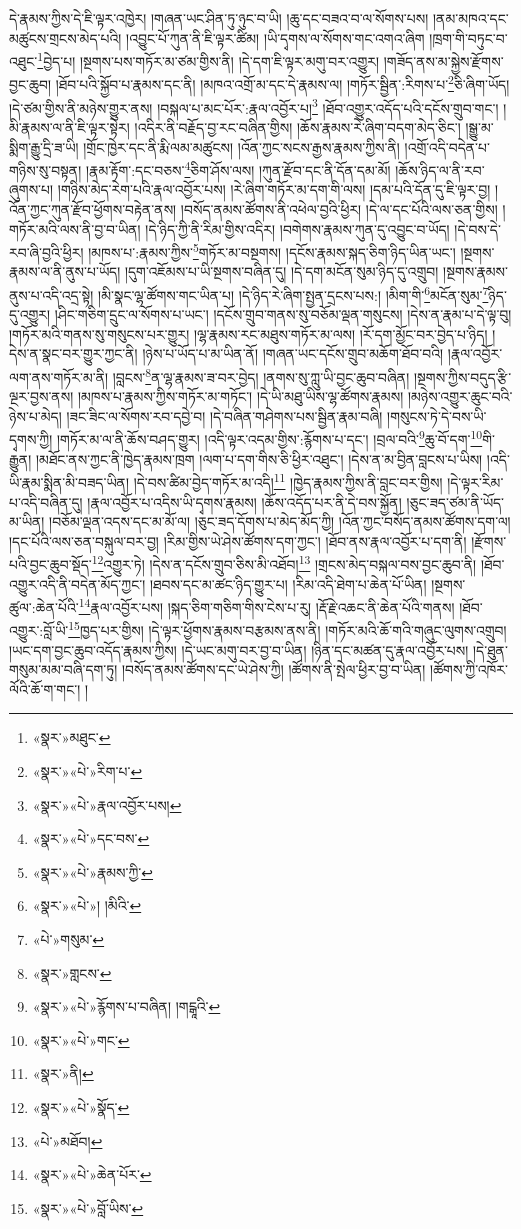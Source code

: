 དེ་རྣམས་ཀྱིས་དེ་ཇི་ལྟར་འཁྱེར། །གཞན་ཡང་ཤིན་ཏུ་ཉུང་བ་ཡི། །ཆུ་དང་བཟའ་བ་ལ་སོགས་པས། །ནམ་མཁའ་དང་མཚུངས་གྲངས་མེད་པའི། །འབྱུང་པོ་ཀུན་ནི་ཇི་ལྟར་ཚིམ། །ཡི་དྭགས་ལ་སོགས་གང་འགའ་ཞིག །ཁྲག་གི་བཏུང་བ་འཐུང་\footnote{«སྣར་»མཐུང་}བྱེད་པ། །སྔགས་པས་གཏོར་མ་ཙམ་གྱིས་ནི། །དེ་དག་ཇི་ལྟར་མགུ་བར་འགྱུར། །གཟོད་ནས་མ་སྐྱེས་རྫོགས་བྱང་ཆུབ། །ཐོབ་པའི་སྐྱོབ་པ་རྣམས་དང་ནི། །མཁའ་འགྲོ་མ་དང་དེ་རྣམས་ལ། །གཏོར་སྦྱིན་:རིགས་པ་\footnote{«སྣར་»«པེ་»རིག་པ་}ཅི་ཞིག་ཡོད། །དེ་ཙམ་གྱིས་ནི་མཉེས་གྱུར་ནས། །བསྐལ་པ་མང་པོར་:རྣལ་འབྱོར་པ།\footnote{«སྣར་»«པེ་»རྣལ་འབྱོར་པས།} །ཐོབ་འགྱུར་འདོད་པའི་དངོས་གྲུབ་གང་། །མི་རྣམས་ལ་ནི་ཇི་ལྟར་སྟེར། །འདིར་ནི་བརྗོད་བྱ་རང་བཞིན་གྱིས། །ཆོས་རྣམས་རེ་ཞིག་བདག་མེད་ཅིང་། །སྒྱུ་མ་སྨིག་རྒྱུ་དྲི་ཟ་ཡི། །གྲོང་ཁྱེར་དང་ནི་རྨི་ལམ་མཚུངས། །འོན་ཀྱང་སངས་རྒྱས་རྣམས་ཀྱིས་ནི། །འགྲོ་འདི་བདེན་པ་གཉིས་སུ་བསྟན། །རྣམ་རྟོག་:དང་བཅས་\footnote{«སྣར་»«པེ་»དང་བས་}ཅིག་ཤོས་ལས། །ཀུན་རྫོབ་དང་ནི་དོན་དམ་མོ། །ཆོས་ཉིད་ལ་ནི་རབ་ཞུགས་པ། །གཉིས་མེད་རེག་པའི་རྣལ་འབྱོར་པས། །རེ་ཞིག་གཏོར་མ་དག་གི་ལས། །དམ་པའི་དོན་དུ་ཇི་ལྟར་བྱ། །འོན་ཀྱང་ཀུན་རྫོབ་ཕྱོགས་བརྟེན་ནས། །བསོད་ནམས་ཚོགས་ནི་འཕེལ་བྱའི་ཕྱིར། །དེ་ལ་དང་པོའི་ལས་ཅན་གྱིས། །གཏོར་མའི་ལས་ནི་བྱ་བ་ཡིན། །དེ་ཉིད་ཀྱི་ནི་རིམ་གྱིས་འདིར། །བགེགས་རྣམས་ཀུན་དུ་འབྱུང་བ་ཡོད། །དེ་བས་དེ་རབ་ཞི་བྱའི་ཕྱིར། །མཁས་པ་:རྣམས་ཀྱིས་\footnote{«སྣར་»«པེ་»རྣམས་ཀྱི་}གཏོར་མ་བསྔགས། །དངོས་རྣམས་སྐད་ཅིག་ཉིད་ཡིན་ཡང་། །སྔགས་རྣམས་ལ་ནི་ནུས་པ་ཡོད། །དུག་འཇོམས་པ་ཡི་སྔགས་བཞིན་དུ། །དེ་དག་མངོན་སུམ་ཉིད་དུ་འགྲུབ། །སྔགས་རྣམས་ནུས་པ་འདི་འདྲ་སྟེ། །མི་སྣང་ལྷ་ཚོགས་གང་ཡིན་པ། །དེ་ཉིད་རེ་ཞིག་སྤྱན་དྲངས་པས:། །མིག་གི་\footnote{«སྣར་»«པེ་»། །མིའི་}མངོན་སུམ་\footnote{«པེ་»གསུམ་}ཉིད་དུ་འགྱུར། །ཤིང་གཅིག་དྲུང་ལ་སོགས་པ་ཡང་། །དངོས་གྲུབ་གནས་སུ་བཅོམ་ལྡན་གསུངས། །དེས་ན་རྣམ་པ་དེ་ལྟ་བུ། །གཏོར་མའི་གནས་སུ་གསུངས་པར་གྱུར། །ལྷ་རྣམས་རང་མཐུས་གཏོར་མ་ལས། །རོ་དག་མྱོང་བར་བྱེད་པ་ཉིད། །
དེས་ན་སྣང་བར་གྱུར་ཀྱང་ནི། །ཉེས་པ་ཡོད་པ་མ་ཡིན་ནོ། །གཞན་ཡང་དངོས་གྲུབ་མཆོག་ཐོབ་བའི། །རྣལ་འབྱོར་ལག་ནས་གཏོར་མ་ནི། །བླངས་\footnote{«སྣར་»གླངས་}ན་ལྷ་རྣམས་ཟ་བར་བྱེད། །ནགས་སུ་ཀླུ་ཡི་བྱང་ཆུབ་བཞིན། །སྔགས་ཀྱིས་བདུད་རྩི་ལྔར་བྱས་ནས། །མཁས་པ་རྣམས་ཀྱིས་གཏོར་མ་གཏོང་། །དེ་ཡི་མཐུ་ཡིས་ལྷ་ཚོགས་རྣམས། །མཉེས་འགྱུར་ཆུང་བའི་ཉེས་པ་མེད། །ཟང་ཟིང་ལ་སོགས་རབ་དབྱེ་བ། །དེ་བཞིན་གཤེགས་པས་སྦྱིན་རྣམ་བཞི། །གསུངས་ཏེ་དེ་བས་ཡི་དྭགས་ཀྱི། །གཏོར་མ་ལ་ནི་ཆོས་བཤད་གྱུར། །འདི་ལྟར་འདམ་གྱིས་:རྙོགས་པ་དང་། །བྲལ་བའི་\footnote{«སྣར་»«པེ་»རྙོགས་པ་བཞིན། །གངྒཱའི་}ཆུ་བོ་དག་\footnote{«སྣར་»«པེ་»གང་}གི་རྒྱུན། །མཐོང་ནས་ཀྱང་ནི་ཁྱེད་རྣམས་ཁྲག །ལག་པ་དག་གིས་ཅི་ཕྱིར་འཐུང་། །དེས་ན་མ་བྱིན་བླངས་པ་ཡིས། །འདི་ཡི་རྣམ་སྨིན་མི་བཟད་ཡིན། །དེ་བས་ཚིམ་བྱེད་གཏོར་མ་འདི།\footnote{«སྣར་»ནི།} །ཁྱེད་རྣམས་ཀྱིས་ནི་བླང་བར་གྱིས། །དེ་ལྟར་རིམ་པ་འདི་བཞིན་དུ། །རྣལ་འབྱོར་པ་འདིས་ཡི་དྭགས་རྣམས། །ཆོས་འདོད་པར་ནི་དེ་བས་སྐྱོན། །ཅུང་ཟད་ཙམ་ནི་ཡོད་མ་ཡིན། །བཅོམ་ལྡན་འདས་དང་མ་མོ་ལ། །ཅུང་ཟད་དོགས་པ་མེད་མོད་ཀྱི། །འོན་ཀྱང་བསོད་ནམས་ཚོགས་དག་ལ། །དང་པོའི་ལས་ཅན་བསྐུལ་བར་བྱ། །རིམ་གྱིས་ཡེ་ཤེས་ཚོགས་དག་ཀྱང་། །ཐོབ་ནས་རྣལ་འབྱོར་པ་དག་ནི། །རྫོགས་པའི་བྱང་ཆུབ་སྡོད་\footnote{«སྣར་»«པེ་»སྣོད་}འགྱུར་ཏེ། །དེས་ན་དངོས་གྲུབ་ཅིས་མི་འཐོབ།\footnote{«པེ་»མཐོབ།} །གྲངས་མེད་བསྐལ་བས་བྱང་ཆུབ་ནི། །ཐོབ་འགྱུར་འདི་ནི་བདེན་མོད་ཀྱང་། །ཐབས་དང་མ་ཚང་ཉིད་གྱུར་པ། །རིམ་འདི་ཐེག་པ་ཆེན་པོ་ཡིན། །སྔགས་ཚུལ་:ཆེན་པོའི་\footnote{«སྣར་»«པེ་»ཆེན་པོར་}རྣལ་འབྱོར་པས། །སྐད་ཅིག་གཅིག་གིས་ངེས་པ་རུ། །རྡོ་རྗེ་འཆང་ནི་ཆེན་པོའི་གནས། །ཐོབ་འགྱུར་:བློ་ཡི་\footnote{«སྣར་»«པེ་»བློ་ཡིས་}ཁྱད་པར་གྱིས། །དེ་ལྟར་ཕྱོགས་རྣམས་བརྩམས་ནས་ནི། །གཏོར་མའི་ཆོ་གའི་གཞུང་ལུགས་འགྲུབ། །ཡང་དག་བྱང་ཆུབ་འདོད་རྣམས་ཀྱིས། །དེ་ཡང་མགུ་བར་བྱ་བ་ཡིན། །ཉིན་དང་མཚན་དུ་རྣལ་འབྱོར་པས། །དེ་ཐུན་གསུམ་མམ་བཞི་དག་ཏུ། །བསོད་ནམས་ཚོགས་དང་ཡེ་ཤེས་ཀྱི། །ཚོགས་ནི་སྤེལ་ཕྱིར་བྱ་བ་ཡིན། །ཚོགས་ཀྱི་འཁོར་ལོའི་ཆོ་ག་གང་། །
